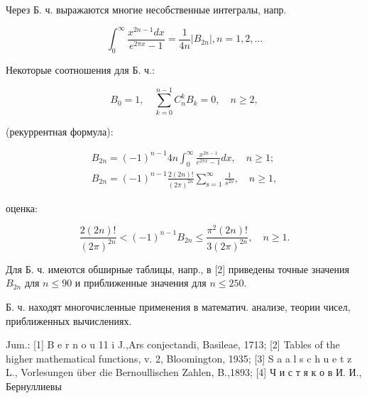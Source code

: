 \documentclass[10pt]{article}
\begin{document}
Через Б. ч. выражаются многие несобственные интегралы, напр.



\[

\int_{0}^{\infty} \frac{x^{2 n-1} d x}{e^{2 \pi x}-1}=\frac{1}{4 n}\left|B_{2 n}\right|, n=1,2, \ldots

\]



Некоторые соотношения для Б. ч.:



\[

B_{0}=1, \quad \sum_{k=0}^{n-1} C_{n}^{k} B_{k}=0, \quad n \geqslant 2,

\]



(рекуррентная формула):



\[

\begin{array}{cl}

B_{2 n}=(-1)^{n-1} 4 n \int_{0}^{\infty} \frac{x^{2 n-1}}{e^{2 \pi x}-1} d x, \quad n \geqslant 1 ; \\

B_{2 n}=(-1)^{n-1} \frac{2(2 n) !}{(2 \pi)^{2 n}} \sum_{\mathrm{s}=1}^{\infty} \frac{1}{s^{2 n}}, \quad n \geqslant 1,

\end{array}

\]



оценка:



\[

\frac{2(2 n) !}{(2 \pi)^{2 n}}<(-1)^{n-1} B_{2 n} \leqslant \frac{\pi^{2}(2 n) !}{3(2 \pi)^{2 n}}, \quad n \geqslant 1 .

\]



Для Б. ч. имеются обширные таблицы, напр., в [2] приведены точные значения $B_{2 n}$ для $n \leqslant 90$ и приближенные значения для $n \leqslant 250$.



Б. ч. находят многочисленные применения в математич. анализе, теории чисел, приближенных вычислениях.



Jum.: [1] B e r n o u 11 i J.,Ars conjectandi, Basileae, 1713; [2] Tables of the higher mathematical functions, v. 2, Bloomington, 1935; [3] S a a l s c h u e t z L., Vorlesungen über die Bernoullischen Zahlen, B.,1893; [4] Ч и с т я к о в И. И., Бернуллиевы
\end{document}
